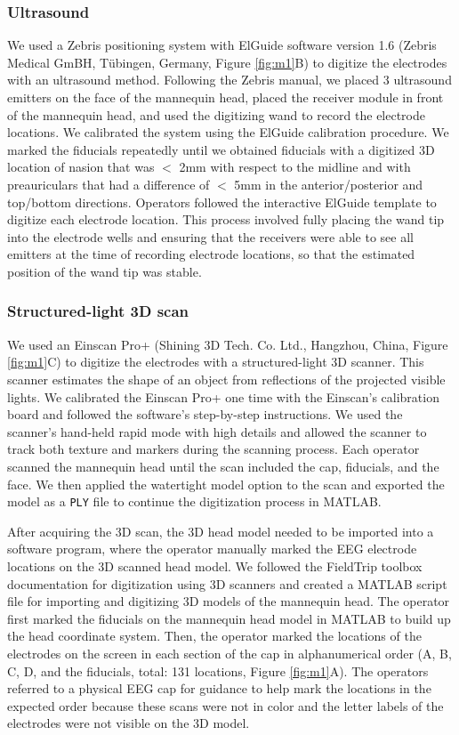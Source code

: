 \documentclass[../thesis_seyed.tex]{subfiles}
\begin{document}
\subsubsection{Ultrasound}
We used a Zebris positioning system with ElGuide software version 1.6 (Zebris Medical GmBH, T\"ubingen, Germany, Figure \ref{fig:m1}B) to digitize the electrodes with an ultrasound method. Following the Zebris manual, we placed 3 ultrasound emitters on the face of the mannequin head, placed the receiver module in front of the mannequin head, and used the digitizing wand to record the electrode locations. We calibrated the system using the ElGuide calibration procedure. We marked the fiducials repeatedly until we obtained fiducials with a digitized 3D location of nasion that was $<$ 2mm with respect to the midline and with preauriculars that had a difference of $<$ 5mm in the anterior/posterior and top/bottom directions. Operators followed the interactive ElGuide template to digitize each electrode location. This process involved fully placing the wand tip into the electrode wells and ensuring that the receivers were able to see all emitters at the time of recording electrode locations, so that the estimated position of the wand tip was stable. 

\subsubsection{Structured-light 3D scan}
We used an Einscan Pro+ (Shining 3D Tech. Co. Ltd., Hangzhou, China, Figure \ref{fig:m1}C) to digitize the electrodes with a structured-light 3D scanner. This scanner estimates the shape of an object from reflections of the projected visible lights. We calibrated the Einscan Pro+ one time with the Einscan's calibration board and followed the software's step-by-step instructions. We used the scanner's hand-held rapid mode with high details and allowed the scanner to track both texture and markers during the scanning process. Each operator scanned the mannequin head until the scan included the cap, fiducials, and the face. We then applied the watertight model option to the scan and exported the model as a {\tt PLY} file to continue the digitization process in MATLAB.

After acquiring the 3D scan, the 3D head model needed to be imported into a software program, where the operator manually marked the EEG electrode locations on the 3D scanned head model. We followed the FieldTrip toolbox documentation for digitization using 3D scanners \cite{noauthor_undated-nm} and created a MATLAB script file for importing and digitizing 3D models of the mannequin head. The operator first marked the fiducials on the mannequin head model in MATLAB to build up the head coordinate system. Then, the operator marked the locations of the electrodes on the screen in each section of the cap in alphanumerical order (A, B, C, D, and the fiducials, total: 131 locations, Figure \ref{fig:m1}A). The operators referred to a physical EEG cap for guidance to help mark the locations in the expected order because these scans were not in color and the letter labels of the electrodes were not visible on the 3D model.
\end{document}
